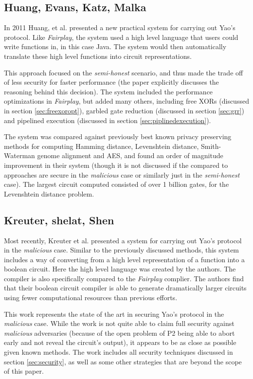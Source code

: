 \subsection{Huang, Evans, Katz, Malka}

In 2011 Huang, et al.\cite{huang2011faster} presented a new practical system for carrying out Yao's protocol.  Like \emph{Fairplay}, the system used a high level language that users could write functions in, in this case Java.  The system would then automatically translate these high level functions into circuit representations.

This approach focused on the \emph{semi-honest} scenario, and thus made the trade off of less security for faster performance (the paper explicitly discusses the reasoning behind this decision). The system included the performance optimizations in \emph{Fairplay}, but added many others, including free XORs (discussed in section \ref{sec:freexoropt}), garbled gate reduction (discussed in section \ref{sec:grr}) and pipelined execution (discussed in section \ref{sec:piplinedexecution}).

The system was compared against previously best known privacy preserving methods for computing Hamming distance, Levenshtein distance, Smith-Waterman genome alignment and AES, and found an order of magnitude improvement in their system (though it is not discussed if the compared to approaches are secure in the \emph{malicious} case or similarly just in the \emph{semi-honest} case). The largest circuit computed consisted of over 1 billion gates, for the Levenshtein distance problem.

\pagebreak
\subsection{Kreuter, shelat, Shen}

Most recently, Kreuter et al.\cite{kreuter2012billion} presented a system for carrying out Yao's protocol in the \emph{malicious} case.  Similar to the previously discussed methods, this system includes a way of converting from a high level representation of a function into a boolean circuit.  Here the high level language was created by the authors.  The compiler is also specifically compared to the \emph{Fairplay} complier.  The authors find that their boolean circuit compiler is able to generate dramatically larger circuits using fewer computational resources than previous efforts.

This work represents the state of the art in securing Yao's protocol in the \emph{malicious} case.  While the work is not quite able to claim full security against \emph{malicious} adversaries (because of the open problem of \ac{P2} being able to abort early and not reveal the circuit's output), it appears to be as close as possible given known methods.  The work includes all security techniques discussed in section \ref{sec:security}, as well as some other strategies that are beyond the scope of this paper.

